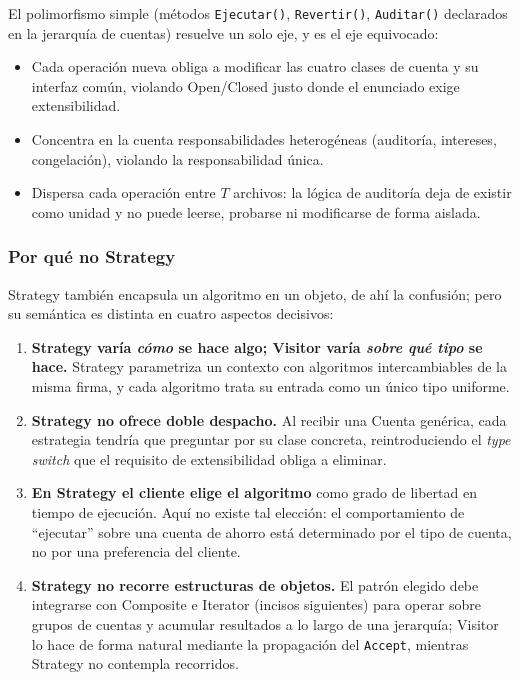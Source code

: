 El polimorfismo simple (métodos \texttt{Ejecutar()}, \texttt{Revertir()}, \texttt{Auditar()}
declarados en la jerarquía de cuentas) resuelve un solo eje, y es el eje equivocado:

\begin{itemize}[leftmargin=1.2cm]
    \item Cada operación nueva obliga a modificar las cuatro clases de cuenta y su interfaz
          común, violando Open/Closed justo donde el enunciado exige extensibilidad.
    \item Concentra en la cuenta responsabilidades heterogéneas (auditoría, intereses,
          congelación), violando la responsabilidad única.
    \item Dispersa cada operación entre $T$ archivos: la lógica de auditoría deja de existir
          como unidad y no puede leerse, probarse ni modificarse de forma aislada.
\end{itemize}

\subsubsection*{Por qué no Strategy}

Strategy también encapsula un algoritmo en un objeto, de ahí la confusión; pero su semántica es
distinta en cuatro aspectos decisivos:

\begin{enumerate}[leftmargin=1.2cm]
    \item \textbf{Strategy varía \emph{cómo} se hace algo; Visitor varía \emph{sobre qué tipo}
          se hace.} Strategy parametriza un contexto con algoritmos intercambiables de la misma
          firma, y cada algoritmo trata su entrada como un único tipo uniforme.
    \item \textbf{Strategy no ofrece doble despacho.} Al recibir una Cuenta genérica, cada
          estrategia tendría que preguntar por su clase concreta, reintroduciendo el
          \textit{type switch} que el requisito de extensibilidad obliga a eliminar.
    \item \textbf{En Strategy el cliente elige el algoritmo} como grado de libertad en tiempo
          de ejecución. Aquí no existe tal elección: el comportamiento de ``ejecutar'' sobre
          una cuenta de ahorro está determinado por el tipo de cuenta, no por una preferencia
          del cliente.
    \item \textbf{Strategy no recorre estructuras de objetos.} El patrón elegido debe
          integrarse con Composite e Iterator (incisos siguientes) para operar sobre grupos de
          cuentas y acumular resultados a lo largo de una jerarquía; Visitor lo hace de forma
          natural mediante la propagación del \texttt{Accept}, mientras Strategy no contempla
          recorridos.
\end{enumerate}

